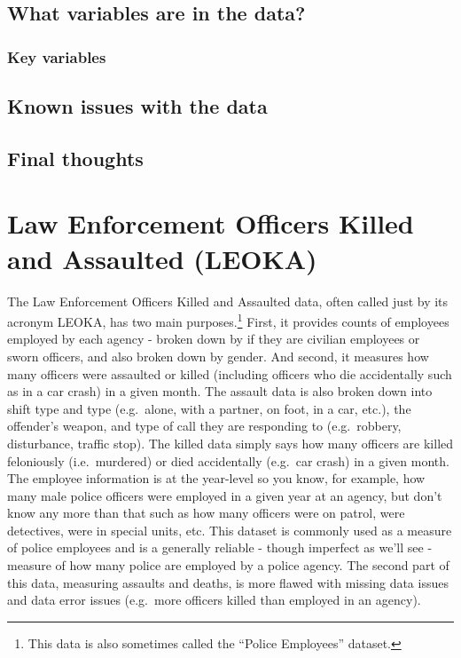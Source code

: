 \documentclass[
  12pt,
  openany]{book}
\begin{document}
\hypertarget{what-variables-are-in-the-data-1}{%
\section{What variables are in the data?}\label{what-variables-are-in-the-data-1}}

\hypertarget{key-variables-1}{%
\subsection{Key variables}\label{key-variables-1}}

\hypertarget{known-issues-with-the-data-1}{%
\section{Known issues with the data}\label{known-issues-with-the-data-1}}

\hypertarget{final-thoughts-1}{%
\section{Final thoughts}\label{final-thoughts-1}}

\hypertarget{leoka}{%
\chapter{Law Enforcement Officers Killed and Assaulted (LEOKA)}\label{leoka}}

The Law Enforcement Officers Killed and Assaulted data, often called just by its acronym LEOKA, has two main purposes.\footnote{This data is also sometimes called the ``Police Employees'' dataset.} First, it provides counts of employees employed by each agency - broken down by if they are civilian employees or sworn officers, and also broken down by gender. And second, it measures how many officers were assaulted or killed (including officers who die accidentally such as in a car crash) in a given month. The assault data is also broken down into shift type and type (e.g.~alone, with a partner, on foot, in a car, etc.), the offender's weapon, and type of call they are responding to (e.g.~robbery, disturbance, traffic stop). The killed data simply says how many officers are killed feloniously (i.e.~murdered) or died accidentally (e.g.~car crash) in a given month. The employee information is at the year-level so you know, for example, how many male police officers were employed in a given year at an agency, but don't know any more than that such as how many officers were on patrol, were detectives, were in special units, etc. This dataset is commonly used as a measure of police employees and is a generally reliable - though imperfect as we'll see - measure of how many police are employed by a police agency. The second part of this data, measuring assaults and deaths, is more flawed with missing data issues and data error issues (e.g.~more officers killed than employed in an agency).
\end{document}
